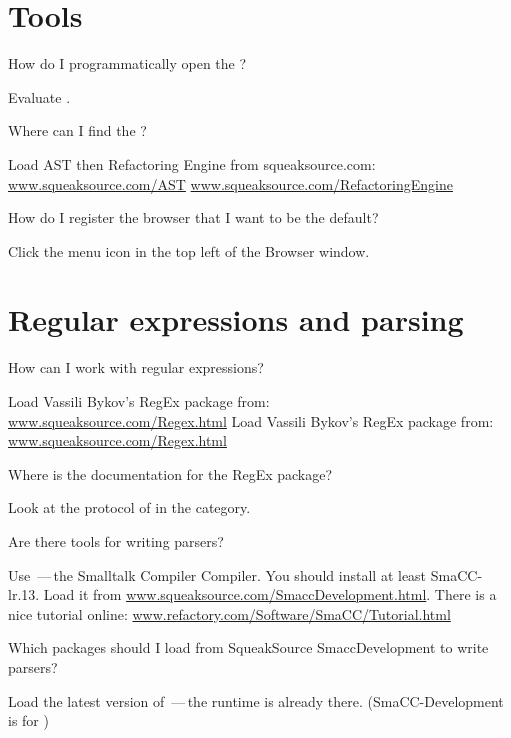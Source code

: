 \documentclass[a4paper,10pt,twoside]{book}
\begin{document}
\section{Tools}

\begin{faq}
How do I programmatically open the  ?
\end{faq}
\answer
Evaluate .

\begin{faq}
Where can I find the ?
\end{faq}
\answer
Load AST then Refactoring Engine from squeaksource.com:
\url{www.squeaksource.com/AST}
\url{www.squeaksource.com/RefactoringEngine}

\begin{faq}
How do I register the browser that I want to be the default?
\end{faq}
\answer
Click the menu icon in the top left of the Browser window.

\section{Regular expressions and parsing}

\begin{faq}
How can I work with regular expressions?
\end{faq}
\answer
\ifluluelse
	{Load Vassili Bykov's RegEx package from: \\
	\url{www.squeaksource.com/Regex.html}}
	{Load Vassili Bykov's RegEx package from:
	\url{www.squeaksource.com/Regex.html}}

\begin{faq}
Where is the documentation for the RegEx package?
\end{faq}
\answer
Look at the  protocol of  in the  category.

\begin{faq}
Are there tools for writing parsers?
\end{faq}
\answer
Use \,---\,the Smalltalk Compiler Compiler.
You should install at least SmaCC-lr.13.
Load it from \url{www.squeaksource.com/SmaccDevelopment.html}.
There is a nice tutorial online:
\url{www.refactory.com/Software/SmaCC/Tutorial.html}

\begin{faq}
Which packages should I load from SqueakSource SmaccDevelopment to write parsers?
\end{faq}
\answer
Load the latest version of \,---\,the runtime is already there.
(SmaCC-Development is for )

\ifx\wholebook\relax\else
\end{document}
